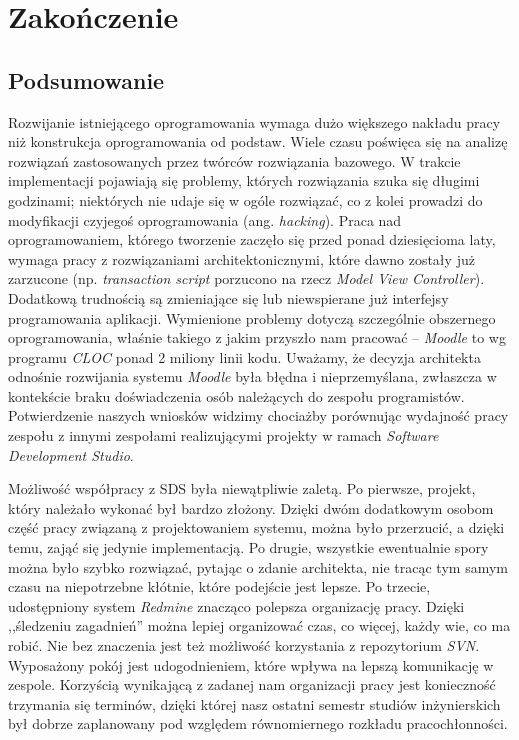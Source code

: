 \chapter{Zakończenie}
\label{Chapter9}

\section{Podsumowanie}
\label{Chapter91}

Rozwijanie istniejącego oprogramowania wymaga dużo większego nakładu pracy niż konstrukcja oprogramowania od podstaw. Wiele czasu poświęca się na analizę rozwiązań zastosowanych przez twórców rozwiązania bazowego. W trakcie implementacji pojawiają się problemy, których rozwiązania szuka się długimi godzinami; niektórych nie udaje się w ogóle rozwiązać, co z kolei prowadzi do modyfikacji czyjegoś oprogramowania (ang. \textit{hacking}). Praca nad oprogramowaniem, którego tworzenie zaczęło się przed ponad dziesięcioma laty, wymaga pracy z rozwiązaniami architektonicznymi, które dawno zostały już zarzucone (np. \textit{transaction script} porzucono na rzecz \textit{Model View Controller}). Dodatkową trudnością są zmieniające się lub niewspierane już interfejsy programowania aplikacji. Wymienione problemy dotyczą szczególnie obszernego oprogramowania, właśnie takiego z jakim przyszło nam pracować -- \textit{Moodle} to wg programu \textit{CLOC} ponad 2 miliony linii kodu. Uważamy, że decyzja architekta odnośnie rozwijania systemu \textit{Moodle} była błędna i nieprzemyślana, zwłaszcza w kontekście braku doświadczenia osób należących do zespołu programistów. Potwierdzenie naszych wniosków widzimy chociażby porównując wydajność pracy zespołu z innymi zespołami realizującymi projekty w ramach \textit{Software Development Studio}.

Możliwość współpracy z SDS była niewątpliwie zaletą. Po pierwsze, projekt, który należało wykonać był bardzo złożony. Dzięki dwóm dodatkowym osobom część pracy związaną z projektowaniem systemu, można było przerzucić, a dzięki temu, zająć się jedynie implementacją. Po drugie, wszystkie ewentualnie spory można było szybko rozwiązać, pytając o zdanie architekta, nie tracąc tym samym czasu na niepotrzebne kłótnie, które podejście jest lepsze. Po trzecie, udostępniony system \textit{Redmine} znacząco polepsza organizację pracy. Dzięki ,,śledzeniu zagadnień'' można lepiej organizować czas, co więcej, każdy wie, co ma robić. Nie bez znaczenia jest też możliwość korzystania z repozytorium \textit{SVN}. Wyposażony pokój jest udogodnieniem, które wpływa na lepszą komunikację w zespole. Korzyścią wynikającą z zadanej nam organizacji pracy jest konieczność trzymania się terminów, dzięki której nasz ostatni semestr studiów inżynierskich był dobrze zaplanowany pod względem równomiernego rozkładu pracochłonności.

